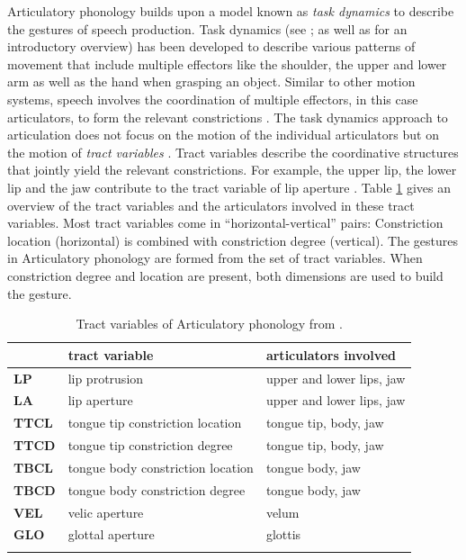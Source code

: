 Articulatory phonology builds upon a model known as \emph{task dynamics} to describe the gestures of speech production. Task dynamics (see \citealp{Saltzman1986, SaltzmanKelso1987, Saltzman1991}; as well as \citealp{Hawkins1992} for an introductory overview) has been developed to describe various patterns of movement that include multiple effectors like the shoulder, the upper and lower arm as well as the hand when grasping an object. Similar to other motion systems, speech involves the coordination of multiple effectors, in this case articulators, to form the relevant constrictions \citep{BrowmanGoldstein1989}. The task dynamics approach to articulation does not focus on the motion of the individual articulators but on the motion of \emph{tract variables} \citep{BrowmanGoldstein1992}. Tract variables describe the coordinative structures that jointly yield the relevant constrictions. For example, the upper lip, the lower lip and the jaw contribute to the tract variable of lip aperture \citep{BrowmanGoldstein1992}. Table \ref{tab:tract_vars} gives an overview of the tract variables and the articulators involved in these tract variables. Most tract variables come in “horizontal-vertical” pairs: Constriction location (horizontal) is combined with constriction degree (vertical). The gestures in Articulatory phonology are formed from the set of tract variables. When constriction degree and location are present, both dimensions are used to build the gesture.

\begin{table}
\caption{Tract variables of Articulatory phonology from \citet[73]{BrowmanGoldstein1989}.}
\begin{tabularx}{\textwidth}{Xll}
&			\textbf{tract variable} &			\textbf{articulators involved}\\
\midrule
\textbf{LP} &		lip protrusion &				upper and lower lips, jaw\\
\textbf{LA} &		lip aperture &				upper and lower lips, jaw\\
\textbf{TTCL} &	tongue tip constriction location &	tongue tip, body, jaw \\
\textbf{TTCD} &	tongue tip constriction degree &		tongue tip, body, jaw \\
\textbf{TBCL} &	tongue body constriction location &	tongue body, jaw \\
\textbf{TBCD} &	tongue body constriction degree &	tongue body, jaw \\
\textbf{VEL} &	velic aperture &				velum \\
\textbf{GLO} &	glottal aperture &				glottis \\
  \lspbottomrule
\end{tabularx}
\label{tab:tract_vars}
\end{table}%

